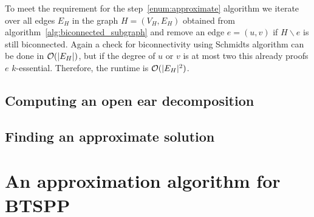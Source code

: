 To meet the requirement for the step~\ref{enum:approximate} algorithm we iterate over all edges \(E_H\) in the graph \(H = (V_H, E_H)\) obtained from algorithm~\ref{alg:biconnected_subgraph} and remove an edge \(e = (u, v)\) if \(H \backslash e\) is still biconnected. Again a check for biconnectivity using Schmidts algorithm can be done in \(\mathcal{O}(\vert E_H \vert)\), but if the degree of \(u\) or \(v\) is at most two this already proofs \(e\) \(k\)-essential. Therefore, the runtime is \(\mathcal{O}(\vert {E_H} \vert^2)\).

\subsection{Computing an open ear decomposition}
\subsection{Finding an approximate solution}

\section{An approximation algorithm for BTSPP}